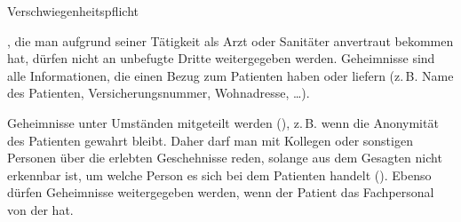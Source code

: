 {Verschwiegenheitspflicht}
{%
\label{topic:verschwiegenheitspflicht}
, die man aufgrund seiner
Tätigkeit als Arzt oder Sanitäter anvertraut bekommen
hat, dürfen nicht an unbefugte Dritte weitergegeben
werden.
{Geheimnisse} sind alle Informationen, die
einen Bezug zum Patienten haben oder liefern (z.\,B.
Name des Patienten, Versicherungsnummer, Wohnadresse,
{\dots}).

Geheimnisse  unter Umständen
mitgeteilt werden (), z.\,B.
 wenn die Anonymität des Patienten gewahrt bleibt. 
Daher darf man mit Kollegen oder sonstigen Personen
über die erlebten Geschehnisse reden, solange aus dem
Gesagten nicht erkennbar ist, um welche Person es sich
bei dem Patienten handelt ().
Ebenso dürfen Geheimnisse weitergegeben werden, wenn der
Patient das Fachpersonal von der  hat.
}
{}
{}
{}
{}


